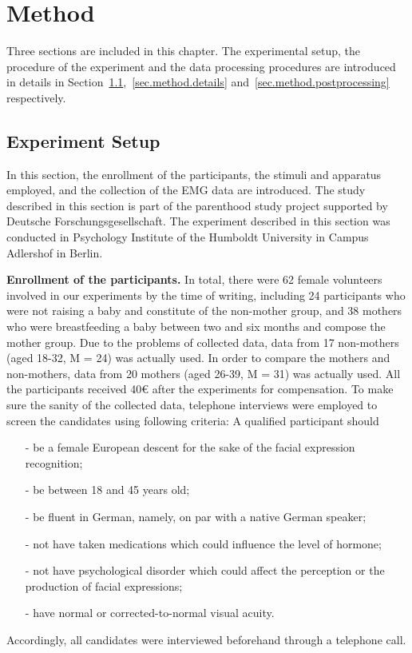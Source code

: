 \chapter{Method}\label{chp.method}

Three sections are included in this chapter. The experimental setup, the procedure of the experiment 
and the data processing procedures are introduced in details 
in Section~\ref{sec.method.setup},~\ref{sec.method.details} and~\ref{sec.method.postprocessing} respectively. 

\section{Experiment Setup}\label{sec.method.setup}
In this section, the enrollment of the participants, 
the stimuli and apparatus employed,
and the collection of the EMG data are introduced. 
The study described in this section is part of the parenthood study project supported by Deutsche Forschungsgesellschaft.
The experiment described in this section was conducted
in Psychology Institute of the Humboldt University in Campus Adlershof in Berlin. 

\textbf{Enrollment of the participants.}
In total, there were 62 female volunteers involved in our experiments by the time of writing, including 24 participants who were not raising a baby and constitute of the non-mother group, and 38 mothers who were breastfeeding a baby between two and six months and compose the mother group. Due to the problems of collected data, data from 17 non-mothers (aged 18-32, M = 24) was actually used. In order to compare the mothers and non-mothers, data from 20 mothers (aged 26-39, M = 31) was actually used.
All the participants received 40€ after the experiments for compensation.
To make sure the sanity of the collected data, telephone interviews 
were employed to screen the candidates using following criteria: A qualified participant should
\begin{itemize}
\item[-] be a female European descent for the sake of the facial expression recognition;
\item[-] be between 18 and 45 years old;
\item[-] be fluent in German, namely, on par with a native German speaker;
\item[-] not have taken medications which could influence the level of hormone;
\item[-] not have psychological disorder which could affect the perception or the production of facial expressions; 
\item[-] have normal or corrected-to-normal visual acuity.
\end{itemize}
Accordingly, all candidates were interviewed beforehand through a telephone call.
	
